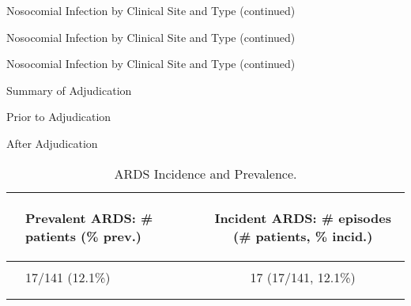 \documentclass[dvips, 10pt]{article}
\begin{document}
\begin{table}
\caption{Nosocomial Infection by Clinical Site and Type (continued)}
\end{table}

\begin{table}
\caption{Nosocomial Infection by Clinical Site and Type (continued)}
\end{table}

\begin{table}
\caption{Nosocomial Infection by Clinical Site and Type (continued)}
\end{table}
\clearpage

\begin{table}
\caption{Summary of Adjudication}
\end{table}
\clearpage

\begin{table}
\caption{Prior to Adjudication}
\end{table}
\clearpage

\begin{table}
\caption{After Adjudication}
\end{table}
\clearpage
\begin{table}[t]
\caption
{ ARDS Incidence and Prevalence. }
\begin{center}
\begin{tabular}{ @{}l@{}
@{}l@{}@{}p{1.5em}@{}@{}c@{}
}
\hline

& \parbox{6em}{\begin{center}Prevalent ARDS: \# patients (\% prev.)\end{center}} && \parbox{6em}{\begin{center}Incident ARDS: \# episodes (\# patients, \% incid.)\end{center}} \\

\hline

\\
& 17/141 (12.1\%) && 17 (17/141, 12.1\%) \\
\\
\hline \\

\end{tabular}

\end{center}
 \end{table}
\clearpage
\end{document}
